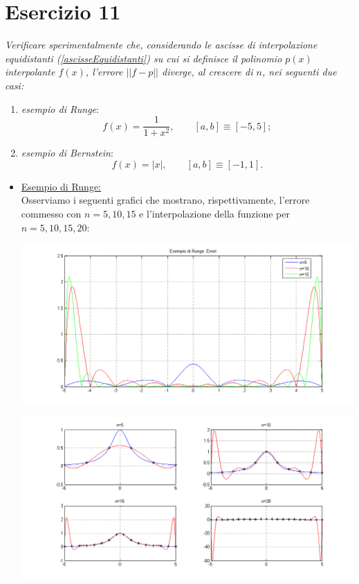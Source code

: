 \section{Esercizio 11}
\label{sub:Esercizio 11}
\emph{Verificare sperimentalmente che, considerando le ascisse di interpolazione equidistanti (\ref{ascisseEquidistanti}) su cui si definisce il polinomio $p(x)$ interpolante $f(x)$, l'errore $||f-p||$ diverge, al crescere di $n$, nei seguenti due casi:}
			\begin{enumerate}
				\item \emph{esempio di Runge}:
					$$f(x)=\frac{1}{1+x^2},\qquad [a,b]\equiv[-5,5];$$
				\item \emph{esempio di Bernstein}:
					$$f(x)=|x|,\qquad [a,b]\equiv[-1,1].$$
			\end{enumerate}
\begin{sol}
	\begin{itemize}
		\item \underline{Esempio di Runge:}\\
			Osserviamo i seguenti grafici che mostrano, rispettivamente, l'errore commesso con $n=5,10,15$ e l'interpolazione della funzione per $n=5,10,15,20$:
			\begin{center}
				\includegraphics[scale=0.4]{img/es4_11a.png}
			\end{center}
			\begin{center}
				\includegraphics[scale=0.4]{img/es4_11b.png}

\end{center}
\end{itemize}
\end{sol}
